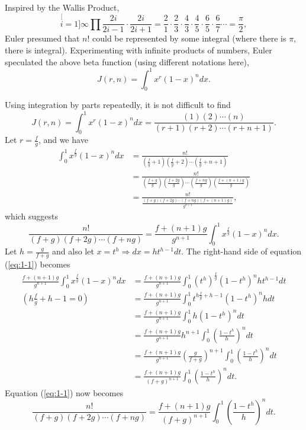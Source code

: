 \documentclass[12pt,oneside,english,american,flalign]{book}\usepackage[]{graphicx}\usepackage[]{color}
\begin{document}
Inspired by the Wallis Product, 
\[
\stackrel[i=1]{\infty}{\prod}\frac{2i}{2i-1}\cdot\frac{2i}{2i+1}=\frac{2}{1}\cdot\frac{2}{3}\cdot\frac{4}{3}\cdot\frac{4}{5}\cdot\frac{6}{5}\cdot\frac{6}{7}\cdots=\frac{\pi}{2},
\]
Euler presumed that $n!$ could be represented by some integral (where
there is $\pi$, there is integral). Experimenting with infinite products
of numbers, Euler speculated the above beta function (using different
notations here),
\[
J\left(r,n\right)=\int_{0}^{1}x^{r}\left(1-x\right)^{n}dx.
\]

\noindent Using integration by parts repeatedly, it is not difficult
to find 
\[
J\left(r,n\right)=\int_{0}^{1}x^{r}\left(1-x\right)^{n}dx=\frac{\left(1\right)\left(2\right)\cdots\left(n\right)}{\left(r+1\right)\left(r+2\right)\cdots\left(r+n+1\right)}.
\]
Let $r=\frac{f}{g}$, and we have 
\begin{align*}
\int_{0}^{1}x^{\frac{f}{g}}\left(1-x\right)^{n}dx & =\frac{n!}{\left(\frac{f}{g}+1\right)\left(\frac{f}{g}+2\right)\cdots\left(\frac{f}{g}+n+1\right)}\\
 & =\frac{n!}{\left(\frac{f+g}{g}\right)\left(\frac{f+2g}{g}\right)\cdots\left(\frac{f+ng}{g}\right)\left(\frac{f+\left(n+1\right)g}{g}\right)}\\
 & =\frac{n!}{\frac{\left(f+g\right)\left(f+2g\right)\cdots\left(f+ng\right)\left(f+\left(n+1\right)g\right)}{g^{n+1}}},
\end{align*}
which suggests
\begin{equation}
\frac{n!}{\left(f+g\right)\left(f+2g\right)\cdots\left(f+ng\right)}=\frac{f+\left(n+1\right)g}{g^{n+1}}\int_{0}^{1}x^{\frac{f}{g}}\left(1-x\right)^{n}dx.\label{eq:1-1}
\end{equation}
Let $h=\frac{g}{f+g}$ and also let $x=t^{h}\Rightarrow dx=ht^{h-1}dt$.
The right-hand side of equation (\ref{eq:1-1}) becomes
\begin{align*}
\frac{f+\left(n+1\right)g}{g^{n+1}}\int_{0}^{1}x^{\frac{f}{g}}\left(1-x\right)^{n}dx & =\frac{f+\left(n+1\right)g}{g^{n+1}}\int_{0}^{1}\left(t^{h}\right)^{\frac{f}{g}}\left(1-t^{h}\right)^{n}ht^{h-1}dt\\
\left(h\frac{f}{g}+h-1=0\right) & =\frac{f+\left(n+1\right)g}{g^{n+1}}\int_{0}^{1}t^{h\frac{f}{g}+h-1}\left(1-t^{h}\right)^{n}hdt\\
 & =\frac{f+\left(n+1\right)g}{g^{n+1}}\int_{0}^{1}h\left(1-t^{h}\right)^{n}dt\\
 & =\frac{f+\left(n+1\right)g}{g^{n+1}}h^{n+1}\int_{0}^{1}\left(\frac{1-t^{h}}{h}\right)^{n}dt\\
 & =\frac{f+\left(n+1\right)g}{g^{n+1}}\left(\frac{g}{f+g}\right)^{n+1}\int_{0}^{1}\left(\frac{1-t^{h}}{h}\right)^{n}dt\\
 & =\frac{f+\left(n+1\right)g}{\left(f+g\right)^{n+1}}\int_{0}^{1}\left(\frac{1-t^{h}}{h}\right)^{n}dt.
\end{align*}
Equation (\ref{eq:1-1}) now becomes 
\begin{equation}
\frac{n!}{\left(f+g\right)\left(f+2g\right)\cdots\left(f+ng\right)}=\frac{f+\left(n+1\right)g}{\left(f+g\right)^{n+1}}\int_{0}^{1}\left(\frac{1-t^{h}}{h}\right)^{n}dt.\label{eq:1-1-1}
\end{equation}
\end{document}

